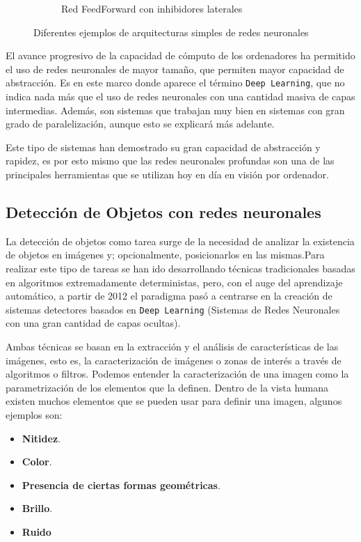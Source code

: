 \begin{figure}[H]
\begin{subfigure}[b]{0.45\textwidth}
        \caption{Red FeedForward con inhibidores laterales}
        \label{fig:c}
    \end{subfigure}
    \caption{Diferentes ejemplos de arquitecturas simples de redes neuronales\cite{duNeuralNetworksStatistical2013}}
    \label{fig:ArquitecturasRedes}
\end{figure}

El avance progresivo de la capacidad de cómputo de los ordenadores ha permitido el uso de redes neuronales de mayor tamaño, que permiten mayor capacidad de abstracción. Es en este marco donde aparece el término 
\texttt{Deep Learning}, que no indica nada más que el uso de redes neuronales con una cantidad masiva de capas intermedias. Además, son sistemas que trabajan muy bien en sistemas con gran grado de paralelización, 
aunque esto se explicará más adelante.

Este tipo de sistemas han demostrado su gran capacidad de abstracción y rapidez, es por esto mismo que las redes neuronales profundas son una de las principales herramientas que se utilizan hoy en día en 
visión por ordenador.

\clearpage
\subsection{Detección de Objetos con redes neuronales}

La detección de objetos como tarea surge de la necesidad de analizar la existencia de objetos en imágenes y; opcionalmente, posicionarlos en las mismas.Para realizar este tipo de tareas se han ido 
desarrollando técnicas tradicionales basadas en algoritmos extremadamente deterministas, pero, con el auge del aprendizaje automático, a partir de 2012\cite{zouObjectDetection202023} 
el paradigma pasó a centrarse en la creación de sistemas detectores basados en \texttt{Deep Learning} (Sistemas de Redes Neuronales con una gran cantidad de capas ocultas).

Ambas técnicas se basan en la extracción y el análisis de características de las imágenes, esto es, la caracterización de imágenes o zonas de interés a través de algoritmos o filtros. Podemos entender la caracterización 
de una imagen como la parametrización de los elementos que la definen. Dentro de la vista humana existen muchos elementos que se pueden usar para definir una imagen, algunos ejemplos son:
\begin{itemize}
    \item \textbf{Nitidez}.
    \item \textbf{Color}.
    \item \textbf{Presencia de ciertas formas geométricas}.
    \item \textbf{Brillo}.
    \item \textbf{Ruido}
\end{itemize}

